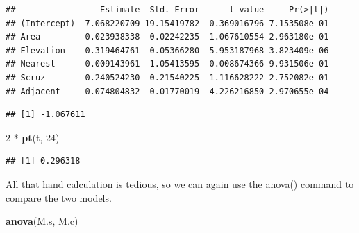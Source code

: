 \documentclass[]{book}
\newenvironment{Shaded}{\begin{snugshade}}{\end{snugshade}}
\newcommand{\KeywordTok}[1]{\textcolor[rgb]{0.13,0.29,0.53}{\textbf{{#1}}}}
\newcommand{\DecValTok}[1]{\textcolor[rgb]{0.00,0.00,0.81}{{#1}}}
\newcommand{\StringTok}[1]{\textcolor[rgb]{0.31,0.60,0.02}{{#1}}}
\newcommand{\NormalTok}[1]{{#1}}
\theoremstyle{definition}
\theoremstyle{definition}
\theoremstyle{remark}
\begin{document}
\begin{Shaded}
\end{Shaded}

\begin{verbatim}
##                 Estimate  Std. Error      t value     Pr(>|t|)
## (Intercept)  7.068220709 19.15419782  0.369016796 7.153508e-01
## Area        -0.023938338  0.02242235 -1.067610554 2.963180e-01
## Elevation    0.319464761  0.05366280  5.953187968 3.823409e-06
## Nearest      0.009143961  1.05413595  0.008674366 9.931506e-01
## Scruz       -0.240524230  0.21540225 -1.116628222 2.752082e-01
## Adjacent    -0.074804832  0.01770019 -4.226216850 2.970655e-04
\end{verbatim}

\begin{Shaded}
\end{Shaded}

\begin{verbatim}
## [1] -1.067611
\end{verbatim}

\begin{Shaded}
\begin{Highlighting}[]
\DecValTok{2} \NormalTok{*}\StringTok{ }\KeywordTok{pt}\NormalTok{(t, }\DecValTok{24}\NormalTok{)}
\end{Highlighting}
\end{Shaded}

\begin{verbatim}
## [1] 0.296318
\end{verbatim}

All that hand calculation is tedious, so we can again use the anova()
command to compare the two models.

\begin{Shaded}
\begin{Highlighting}[]
\KeywordTok{anova}\NormalTok{(M.s, M.c)}
\end{Highlighting}
\end{Shaded}
\end{document}
